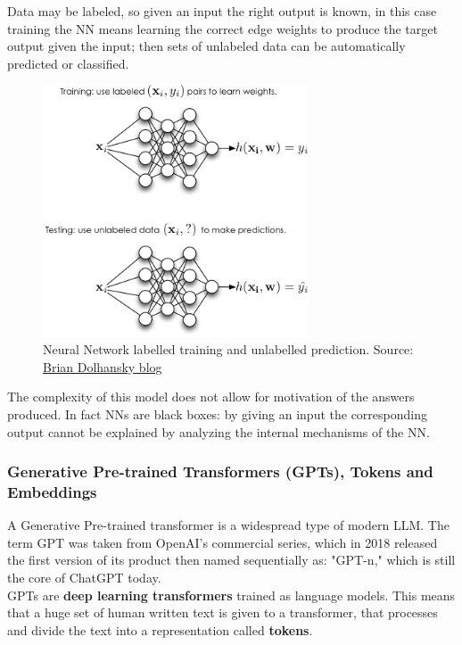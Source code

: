 \documentclass[12pt]{article}
\begin{document}
Data may be labeled, so given an input the right output is known, in this case training the NN means learning the correct edge weights to produce the target output given the input; then sets of unlabeled data can be automatically predicted or classified.
    \begin{figure}[H]
    \centering
            \includegraphics[width=0.7\textwidth]{trainingNN.png}
    \caption[Neural Network labelled training and unlabelled prediction]{Neural Network labelled training and unlabelled prediction. Source: \href{https://www.briandolhansky.com/blog/artificial-neural-networks-linear-regression-part-1}{Brian Dolhansky blog}}
    \end{figure}

The complexity of this model does not allow for motivation of the answers produced. In fact NNs are black boxes: by giving an input the corresponding output cannot be explained by analyzing the internal mechanisms of the NN.

        \subsubsection{Generative Pre-trained Transformers (GPTs), Tokens and Embeddings}
A Generative Pre-trained transformer is a widespread type of modern LLM. The term GPT was taken from OpenAI's commercial series, which in 2018 released the first version of its product then named sequentially as: "GPT-n," which is still the core of ChatGPT today.\\
GPTs are \textbf{deep learning transformers} trained as language models. This means that a huge set of human written text is given to a transformer, that processes and divide the text into a representation called \textbf{tokens}.\\
\end{document}
